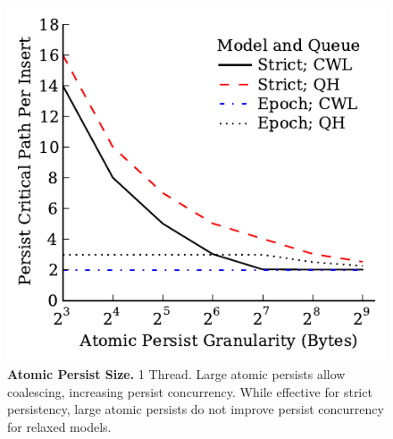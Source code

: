\begin{figure}
  \centering
  \includegraphics[width=.55\linewidth]{PersistencyEval/Coalescing.pdf}
  \caption{\textbf{Atomic Persist Size.} 1 Thread. Large atomic persists allow coalescing, increasing persist concurrency.  While effective for strict persistency, large atomic persists do not improve persist concurrency for relaxed models.}
  \label{fig::Coalescing}
\end{figure}
